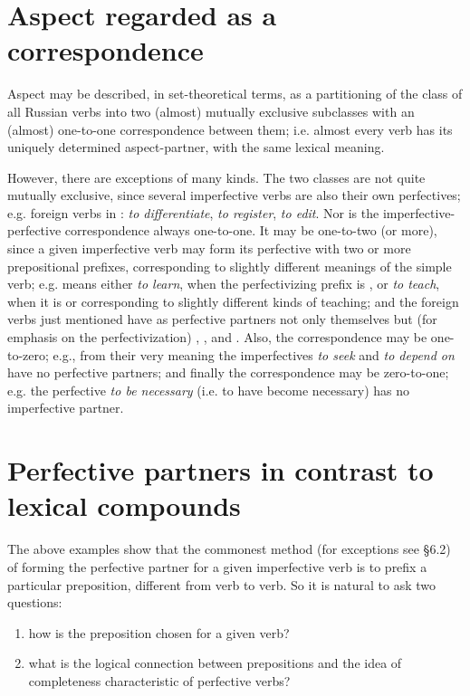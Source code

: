 \section{Aspect regarded as a correspondence}

Aspect may be described, in set-theoretical terms, as a partitioning of the class of all Russian verbs into two (almost) mutually exclusive subclasses with an (almost) one-to-one correspondence between them; i.e. almost every verb has its uniquely determined aspect-partner, with the same lexical meaning.

However, there are exceptions of many kinds. The two classes are not quite mutually exclusive, since several imperfective verbs are also their own perfectives; e.g. foreign verbs in :  \emph{to differentiate},  \emph{to register},  \emph{to edit}. Nor is the imperfective-perfective correspondence always one-to-one. It may be one-to-two (or more), since a given imperfective verb may form its perfective with two or more prepositional prefixes, corresponding to slightly different meanings of the simple verb; e.g.  means either \emph{to learn}, when the perfectivizing prefix is , or \emph{to teach}, when it is  or  corresponding to slightly different kinds of teaching; and the foreign verbs just mentioned have as perfective partners not only themselves but (for emphasis on the perfectivization) , , and . Also, the correspondence may be one-to-zero; e.g., from their very meaning the imperfectives  \emph{to seek} and  \emph{to depend on} have no perfective partners; and finally the correspondence may be zero-to-one; e.g. the perfective  \emph{to be necessary} (i.e. to have become necessary) has no imperfective partner.

\section{Perfective partners in contrast to lexical compounds}

The above examples show that the commonest method (for exceptions see §6.2) of forming the perfective partner for a given imperfective verb is to prefix a particular preposition, different from verb to verb. So it is natural to ask two questions:
\begin{enumerate}[label=\roman*)]
\item how is the preposition chosen for a given verb?
\item what is the logical connection between prepositions and the idea of completeness characteristic of perfective verbs?
\end{enumerate}

